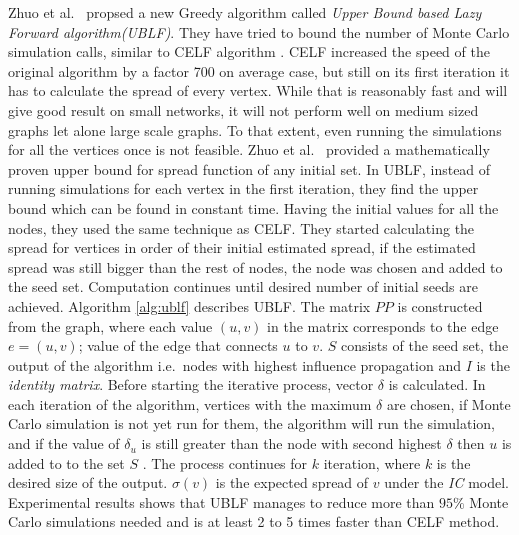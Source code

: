 \documentclass[english]{tktltiki}
\begin{document}
Zhuo et al.\ \cite{zhuo13} propsed a new Greedy algorithm called \textit{Upper Bound based Lazy Forward algorithm(UBLF)}. 
They have tried to bound the number of Monte Carlo simulation calls, similar to CELF algorithm \cite{leskovec07}. 
CELF increased the speed of the original algorithm by a factor 700 on average case, but still on its first iteration it has to calculate the spread of every vertex.
While that is reasonably fast and will give good result on small networks, it will not perform well on medium sized graphs let alone large scale graphs. 
To that extent, even running the simulations for all the vertices once is not feasible. 
Zhuo et al.\ \cite{zhuo13} provided a mathematically proven upper bound for spread function of any initial set. 
In UBLF, instead of running simulations for each vertex in the first iteration, they find the upper bound which can be found in constant time. Having the initial values for all the nodes, they used the same technique as CELF. 
They started calculating the spread for vertices in order of their initial estimated spread, if the estimated spread was still bigger than the rest of nodes, the node was chosen and added to the seed set. 
Computation continues until desired number of initial seeds are achieved. 
Algorithm \ref{alg:ublf} describes UBLF. 
The matrix $PP$ is constructed from the graph, where each value $(u,v)$ in the matrix corresponds to the edge $e=(u,v)$; value of the edge that connects $u$ to $v$. 
$S$ consists of the seed set, the output of the algorithm i.e.\ nodes with highest influence propagation and $I$ is the \textit{identity matrix}. Before starting the iterative process, vector $\delta$ is calculated. 
In each iteration of the algorithm, vertices with the maximum $\delta$ are chosen, if Monte Carlo simulation is not yet run for them, the algorithm will run the simulation, and if the value of $\delta_u$ is still greater than the node with second highest $\delta$ then $u$ is added to to the set $S$ . 
The process continues for $k$ iteration, where $k$ is the desired size of the output. 
$\sigma(v)$ is the expected spread of $v$ under the \textit{IC} model. 
Experimental results shows that UBLF manages to reduce more than $95\%$ Monte Carlo simulations needed and is at least 2 to 5 times faster than CELF method.
\end{document}
